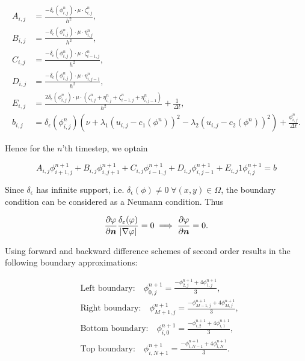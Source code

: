 \begin{align*}
A_{i,j} &= \frac{-\delta_\epsilon(\phi_{i,j}^n)\cdot\mu\cdot \zeta_{i,j}^n}{h^2},\\
B_{i,j} &= \frac{-\delta_\epsilon(\phi_{i,j}^n)\cdot\mu\cdot\eta_{i,j}^n}{h^2},\\
C_{i,j} &= \frac{-\delta_\epsilon(\phi_{i,j}^n)\cdot\mu\cdot \zeta_{i-1,j}^n}{h^2},\\
D_{i,j} &= \frac{-\delta_\epsilon(\phi_{i,j}^n)\cdot\mu\cdot\eta_{i,j-1}^n}{h^2},\\
E_{i,j} &= \frac{2\delta_\epsilon(\phi_{i,j}^n)\cdot\mu\cdot(\zeta_{i,j}^n + \eta_{i,j}^n + \zeta_{i-1,j}^n +\eta_{i,j-1}^n)}{h^2}+\frac{1}{\Delta t},\\
b_{i,j} &= \delta_\epsilon(\phi_{i,j}^n)\left(\nu + \lambda_1(u_{i,j}-c_1(\phi^n))^2 - \lambda_2(u_{i,j}-c_2(\phi^n))^2\right) + \frac{\phi_{i,j}^n}{\Delta t}.
\end{align*}

Hence for the $n$'th timestep, we optain

\begin{equation}
A_{i,j}\phi_{i+1,j}^{n+1} + B_{i,j}\phi_{i,j+1}^{n+1} + C_{i,j}\phi_{i-1,j}^{n+1} + D_{i,j}\phi_{i,j-1}^{n+1} + E_{i,j}1\phi_{i,j}^{n+1} = b\label{LinSys}
\end{equation}

Since $\delta_\epsilon$ has infinite support, i.e. $\delta_\epsilon(\phi)\neq 0\;\forall (x,y)\in\Omega$, the boundary condition can be considered as a Neumann condition. Thus

\begin{equation}
\frac{\partial \varphi}{\partial \boldsymbol{n} }\frac{\delta_\varepsilon(\varphi)}{\left| {\nabla\varphi} \right|}=0 \implies \frac{\partial \varphi}{\partial \boldsymbol{n} }=0.
\end{equation}

Using forward and backward difference schemes of second order results in the following boundary approximations:

\begin{align*}
&\text{Left boundary:}\quad \phi_{0,j}^{n+1} = \frac{-\phi_{2,j}^{n+1}+4\phi_{1,j}^{n+1}}{3},\\
&\text{Right boundary:}\quad \phi_{M+1,j}^{n+1} = \frac{-\phi_{M-1,j}^{n+1}+4\phi_{M,j}^{n+1}}{3},\\
&\text{Bottom boundary:}\quad \phi_{i,0}^{n+1} = \frac{-\phi_{i,2}^{n+1}+4\phi_{i,1}^{n+1}}{3},\\
&\text{Top boundary:}\quad \phi_{i,N+1}^{n+1} = \frac{-\phi_{i,N-1}^{n+1}+4\phi_{i,N}^{n+1}}{3}.
\end{align*}

